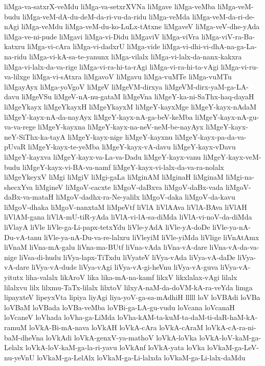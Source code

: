 {liMga-va-satxrX-veMdu
liMga-va-setxrXVNa
liMgave
liMga-veMba
liMga-veM-budu
liMga-veM-dA-du-deM-da-ri-vu-da-ridu
liMga-veMda
liMga-veM-da-ri-de-nAgi
liMga-veMdu
liMga-veM-du-ko-LuLx-tAtxne
liMgaveV
liMga-veV-dhe-yAda
liMga-ve-ni-pude
liMgavi
liMga-vi-Didu
liMgaviV
liMga-viVra
liMga-viV-ra-Ba-katxru
liMga-vi-cAra
liMga-vi-dadxrU
liMga-vide
liMga-vi-dhi-vi-dhA-na-ga-La-na-ridu
liMga-vi-kA-sa-te-yanunx
liMga-vilalx
liMga-vi-lalx-da-nanx-kakxra
liMga-vi-lalx-da-va-rige
liMga-vi-ra-hi-ta-rAgi
liMga-vi-ra-hi-ta-vAgi
liMga-vi-ru-va-lilxge
liMga-vi-sAtxra
liMgavoV
liMgavu
liMga-vuMTe
liMga-vuMTu
liMgayAyx
liMga-yoVgoV
liMgeV
liMgeVM-dirxya
liMgeVM-dirx-yaM-ga-LA-davu
liMgeVSu
liMgeV-nA-nu-gataM
liMgeVna
liMgeY-ka-ni-SaThx-haq-dayaH
liMgeYkayx
liMgeYkayxH
liMgeYkayxM
liMgeY-kayxMge
liMgeY-kayx-nAdaM
liMgeY-kayx-nA-da-nayAyx
liMgeY-kayx-nA-ga-beV-keMba
liMgeY-kayx-nA-gu-va-va-rege
liMgeY-kayxna
liMgeY-kayx-na-neV-neM-be-nayAyx
liMgeY-kayx-neY-SiThx-ka-tayA
liMgeY-kayx-nige
liMgeY-kayxnu
liMgeY-kayx-pa-da-va-pUvaR
liMgeY-kayx-te-yeMba
liMgeY-kayx-vA-davu
liMgeY-kayx-vDavu
liMgeY-kayxva
liMgeY-kayx-va-La-va-Dadu
liMgeY-kayx-vanu
liMgeY-kayx-veM-budu
liMgeY-kayx-vi-BA-va-namf
liMgeY-kayx-vi-lalx-da-va-ra-nolalx
liMgeYkeyxV
liMgi
liMgiV
liMgi-gaLa
liMginAM
liMginaH
liMginaM
liMgi-na-shecxYva
liMgineV
liMgoV-cacxte
liMgoV-daBxva
liMgoV-daBx-vada
liMgoV-daBx-va-mataH
liMgoV-dadhx-ra-Ne-yalilx
liMgoV-daka
liMgoV-da-kavu
liMgoV-dhaka
liMgoV-nanxtaM
liMpeVtf
liVlA
liVlAAva
liVlA-BAva
liVlAH
liVlAM-gana
liVlA-mU-tiR-yAda
liVlA-vi-lA-sa-diMda
liVlA-vi-noV-da-diMda
liVlayA
liVle
liVle-ga-Li-papx-tetxYdu
liVle-yAdA
liVle-yA-doDe
liVle-ya-nA-Du-vA-tanu
liVle-ya-nA-Du-va-re-lalxru
liVleyiM
liVle-yiMda
liVlige
liVnAtAmx
liVnaM
liVna-mA-galu
liVna-ma-BUtf
liVna-vAda
liVna-vA-dare
liVna-vA-da-va-nige
liVsa-di-hudu
liVya-lapx-TiTxdu
liVyateV
liVya-vAda
liVya-vA-daDe
liVya-vA-dare
liVya-vA-dude
liVya-vAgi
liVya-vA-gi-heVnu
liVya-vA-guva
liVya-vA-yitutx
liha-valalx
likAroV
lika
lika-mA-na-kamf
likxV
likxlalax-vAgi
lilalx
lilalxvu
lilx
lilxmu-TaTx-lilalx
lilxtoV
lilxyA-naM-da-doVM-kA-ra-veYda
limga
lipayxteV
lipeyxVta
lipiya
liyAgi
liya-yoV-ga-sa-mAdhiH
lllll
loV
loVBAdi
loVBa
loVBaM
loVBada
loVBa-veMba
loVBi-ga-LA-gu-vudu
loVcana
loVcanaH
loVcaneV
loVhada
loVha-ga-LiMda
loVha-kAM-ta-kuM-ta-daM-ti-daR-haM-kA-ramuM
loVkA-Bi-mA-nava
loVkAH
loVkA-cAra
loVkA-cAraM
loVkA-cA-ra-ni-baM-dheVna
loVkAdi
loVkA-genxV-ya-mathoV
loVkA-loVka
loVkA-loV-kaM-ga-Lelalx
loVkA-loV-kaM-ga-la-ri-yavu
loVkAnf
loVkA-yata
loVka
loVkaM-ga-LeV-nu-yeVnU
loVkaM-ga-LelAlx
loVkaM-ga-Li-lalxda
loVkaM-ga-Li-lalx-daMdu
}
